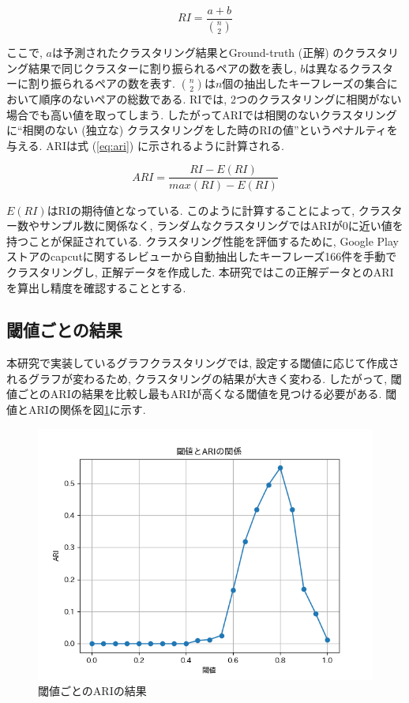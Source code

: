 \begin{equation}
  \label{eq:ri}
  RI = \frac{a+b}{\binom{n}{2}}
\end{equation}

ここで, \(a\)は予測されたクラスタリング結果とGround-truth (正解) のクラスタリング結果で同じクラスターに割り振られるペアの数を表し, \(b\)は異なるクラスターに割り振られるペアの数を表す. \(\binom{n}{2}\)は\(n\)個の抽出したキーフレーズの集合において順序のないペアの総数である. 
RIでは, 2つのクラスタリングに相関がない場合でも高い値を取ってしまう. したがってARIでは相関のないクラスタリングに``相関のない (独立な) クラスタリングをした時のRIの値''というペナルティを与える. ARIは式 (\ref{eq:ari}) に示されるように計算される. 

\begin{equation}
  \label{eq:ari}
  ARI = \frac{RI-E (RI) }{max (RI) -E (RI) }
\end{equation}

\(E(RI)\)はRIの期待値となっている. このように計算することによって, クラスター数やサンプル数に関係なく, ランダムなクラスタリングではARIが0に近い値を持つことが保証されている. 
クラスタリング性能を評価するために, Google Playストアのcapcutに関するレビューから自動抽出したキーフレーズ166件を手動でクラスタリングし, 正解データを作成した. 本研究ではこの正解データとのARIを算出し精度を確認することとする. 

\subsection{閾値ごとの結果}
本研究で実装しているグラフクラスタリングでは, 設定する閾値に応じて作成されるグラフが変わるため, クラスタリングの結果が大きく変わる. したがって, 閾値ごとのARIの結果を比較し最もARIが高くなる閾値を見つける必要がある. 
閾値とARIの関係を図\ref{fig:cw_graph}に示す.

\begin{figure}[H]
  \centering
  \includegraphics[scale=0.8]
    {contents/images/cw_graph.png}
  \caption{閾値ごとのARIの結果\label{fig:cw_graph}}
\end{figure}

